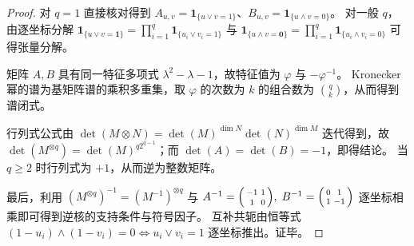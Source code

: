 \begin{proof}
对 \(q=1\) 直接核对得到 \(A_{u,v}=\mathbf{1}_{\{u\vee v=1\}}\)、\(B_{u,v}=\mathbf{1}_{\{u\wedge v=0\}}\)。
对一般 \(q\)，由逐坐标分解
\(
\mathbf{1}_{\{u\vee v=\mathbf{1}\}}=\prod_{i=1}^q \mathbf{1}_{\{u_i\vee v_i=1\}}
\)
与
\(
\mathbf{1}_{\{u\wedge v=\mathbf{0}\}}=\prod_{i=1}^q \mathbf{1}_{\{u_i\wedge v_i=0\}}
\)
可得张量分解。
\par
矩阵 \(A,B\) 具有同一特征多项式 \(\lambda^2-\lambda-1\)，故特征值为 \(\varphi\) 与 \(-\varphi^{-1}\)。
Kronecker 幂的谱为基矩阵谱的乘积多重集，取 \(\varphi\) 的次数为 \(k\) 的组合数为 \(\binom{q}{k}\)，从而得到谱闭式。
\par
行列式公式由 \(\det(M\otimes N)=\det(M)^{\dim N}\det(N)^{\dim M}\) 迭代得到，故 \(\det(M^{\otimes q})=\det(M)^{q2^{q-1}}\)；而 \(\det(A)=\det(B)=-1\)，即得结论。
当 \(q\ge 2\) 时行列式为 \(+1\)，从而逆为整数矩阵。
\par
最后，利用 \((M^{\otimes q})^{-1}=(M^{-1})^{\otimes q}\) 与
\(
A^{-1}=\begin{psmallmatrix}-1&1\\[2pt]1&0\end{psmallmatrix},
\;
B^{-1}=\begin{psmallmatrix}0&1\\[2pt]1&-1\end{psmallmatrix}
\)
逐坐标相乘即可得到逆核的支持条件与符号因子。
互补共轭由恒等式
\(
(1-u_i)\wedge(1-v_i)=0\iff u_i\vee v_i=1
\)
逐坐标推出。证毕。
\end{proof}

\endinput
